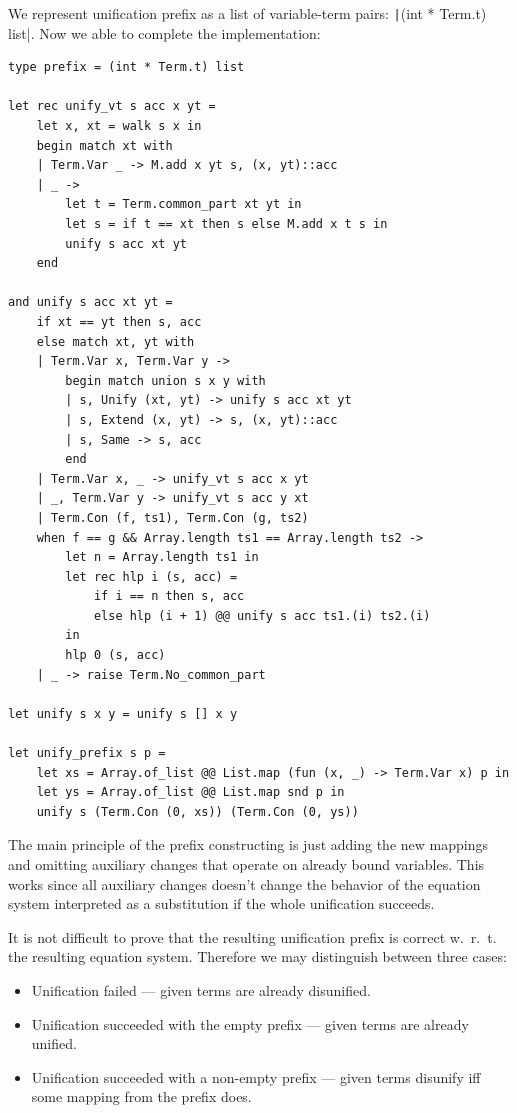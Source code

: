 We represent unification prefix as a list of variable-term pairs: \texttt|(int * Term.t) list|. Now we able to complete the \unify implementation:
\begin{verbatim}
type prefix = (int * Term.t) list

let rec unify_vt s acc x yt =
    let x, xt = walk s x in
    begin match xt with
    | Term.Var _ -> M.add x yt s, (x, yt)::acc
    | _ ->
        let t = Term.common_part xt yt in
        let s = if t == xt then s else M.add x t s in
        unify s acc xt yt
    end

and unify s acc xt yt =
    if xt == yt then s, acc
    else match xt, yt with
    | Term.Var x, Term.Var y ->
        begin match union s x y with
        | s, Unify (xt, yt) -> unify s acc xt yt
        | s, Extend (x, yt) -> s, (x, yt)::acc
        | s, Same -> s, acc
        end
    | Term.Var x, _ -> unify_vt s acc x yt
    | _, Term.Var y -> unify_vt s acc y xt
    | Term.Con (f, ts1), Term.Con (g, ts2)
    when f == g && Array.length ts1 == Array.length ts2 ->
        let n = Array.length ts1 in
        let rec hlp i (s, acc) =
            if i == n then s, acc
            else hlp (i + 1) @@ unify s acc ts1.(i) ts2.(i)
        in
        hlp 0 (s, acc)
    | _ -> raise Term.No_common_part

let unify s x y = unify s [] x y

let unify_prefix s p =
    let xs = Array.of_list @@ List.map (fun (x, _) -> Term.Var x) p in
    let ys = Array.of_list @@ List.map snd p in
    unify s (Term.Con (0, xs)) (Term.Con (0, ys))
\end{verbatim}

The main principle of the prefix constructing is just adding the new mappings and omitting auxiliary changes that operate on already bound variables. This works since all auxiliary changes doesn't change the behavior of the equation system interpreted as a substitution if the whole unification succeeds.

It is not difficult to prove that the resulting unification prefix is correct w.~r.~t. the resulting equation system. Therefore we may distinguish between three cases:
\begin{itemize}
    \item Unification failed --- given terms are already disunified.
    \item Unification succeeded with the empty prefix --- given terms are already unified.
    \item Unification succeeded with a non-empty prefix --- given terms disunify iff some mapping from the prefix does.
\end{itemize}


